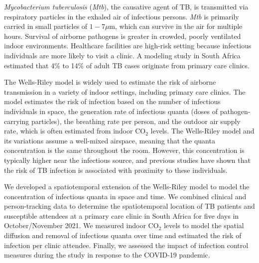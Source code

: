 \documentclass[fleqn,11pt]{wlscirep}
\begin{document}
\emph{Mycobacterium tuberculosis} (\emph{Mtb}), the causative agent of TB, is transmitted via respiratory particles in the exhaled air of infectious persons\cite{Rieder1999,Patterson2021Tuberculosis}. \emph{Mtb} is primarily carried in small particles of $1-7\mu$m\cite{Fennelly2020Lancet}, which can survive in the air for multiple hours\cite{Loudon1969AMRRD}. Survival of airborne pathogens is greater in crowded, poorly ventilated indoor environments\cite{Rieder1999,CPS2013Book,Nardell1991ARRD,Wang2021Science,Morawska2021}. Healthcare facilities are high-risk setting because infectious individuals are more likely to visit a clinic\cite{McCreesh2020IJTLD}. A modeling study in South Africa estimated that 4\% to 14\% of adult TB cases originate from primary care clinics\cite{McCreesh2022BMJGlobalHealth}.

The Wells-Riley model\cite{Riley1961Book} is widely used to estimate the risk of airborne transmission in a variety of indoor settings\cite{Haddrell2024NatCommun,Andrews2014JID,Taylor2016IJTLD,Hella2017JInfect,Zemouri2020JDR}, including primary care clinics\cite{Zurcher2022JID,McCreesh2021BMJGlobalHealth}. The model estimates the risk of infection based on the number of infectious individuals in space, the generation rate of infectious quanta (doses of pathogen-carrying particles), the breathing rate per person, and the outdoor air supply rate, which is often estimated from indoor CO$_2$ levels\cite{Rudnick2003IndoorAir,Richardson2014PONE,Haddrell2024NatCommun}. The Wells-Riley model and its variations\cite{Rudnick2003IndoorAir} assume a well-mixed airspace, meaning that the quanta concentration is the same throughout the room. However, this concentration is typically higher near the infectious source\cite{Wang2021Science,Vuorinen2020SafSci,Chen2020BuildEnv}, and previous studies have shown that the risk of TB infection is associated with proximity to these individuals\cite{Ko2004RiskAnal,Kenyon1996NEJM}.

We developed a spatiotemporal extension of the Wells-Riley model to model the concentration of infectious quanta in space and time. We combined clinical and person-tracking data to determine the spatiotemporal location of TB patients and susceptible attendees at a primary care clinic in South Africa for five days in October/November 2021. We measured indoor CO$_2$ levels to model the spatial diffusion and removal of infectious quanta over time and estimated the risk of infection per clinic attendee. Finally, we assessed the impact of infection control measures during the study in response to the COVID-19 pandemic.
\end{document}
